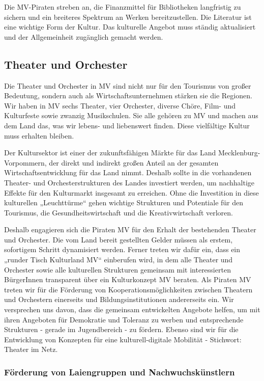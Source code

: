 Die MV-Piraten streben an, die Finanzmittel für Bibliotheken langfristig zu sichern und ein breiteres Spektrum an Werken bereitzustellen. Die Literatur ist eine wichtige Form der Kultur. Das kulturelle Angebot muss ständig aktualisiert und der Allgemeinheit zugänglich gemacht werden.

\subsection{Theater und Orchester}

Die Theater und Orchester in MV sind nicht nur für den Tourismus von großer Bedeutung, sondern auch als Wirtschaftsunternehmen stärken sie die Regionen. Wir haben in MV sechs Theater, vier Orchester, diverse Chöre, Film- und Kulturfeste sowie zwanzig Musikschulen. Sie alle gehören zu MV und machen aus dem Land das, was wir lebens- und liebenswert finden. Diese vielfältige Kultur muss erhalten bleiben.

Der Kultursektor ist einer der zukunftsfähigen Märkte für das Land Mecklenburg-Vorpommern, der direkt und indirekt großen Anteil an der gesamten Wirtschaftsentwicklung für das Land nimmt. Deshalb sollte in die vorhandenen Theater- und Orchesterstrukturen des Landes investiert werden, um nachhaltige Effekte für den Kulturmarkt insgesamt zu erreichen. Ohne die Investition in diese kulturellen „Leuchttürme`` gehen wichtige Strukturen und Potentiale für den Tourismus, die Gesundheitswirtschaft und die Kreativwirtschaft verloren.

Deshalb engagieren sich die Piraten MV für den Erhalt der bestehenden Theater und Orchester. Die vom Land bereit gestellten Gelder müssen als erstem, sofortigem Schritt dynamisiert werden. Ferner treten wir dafür ein, dass ein „runder Tisch Kulturland MV`` einberufen wird, in dem alle Theater und Orchester sowie alle kulturellen Strukturen gemeinsam mit interessierten BürgerInnen transparent über ein Kulturkonzept MV beraten. Als Piraten MV treten wir für die Förderung von Kooperationsmöglichkeiten zwischen Theatern und Orchestern einerseits und Bildungsinstitutionen andererseits ein. Wir versprechen uns davon, dass die gemeinsam entwickelten Angebote helfen, um mit ihren Angeboten für Demokratie und Toleranz zu werben und entsprechende Strukturen - gerade im Jugendbereich - zu fördern. Ebenso sind wir für die Entwicklung von Konzepten für eine kulturell-digitale Mobilität - Stichwort: Theater im Netz.

\subsubsection{Förderung von Laiengruppen und Nachwuchskünstlern}


